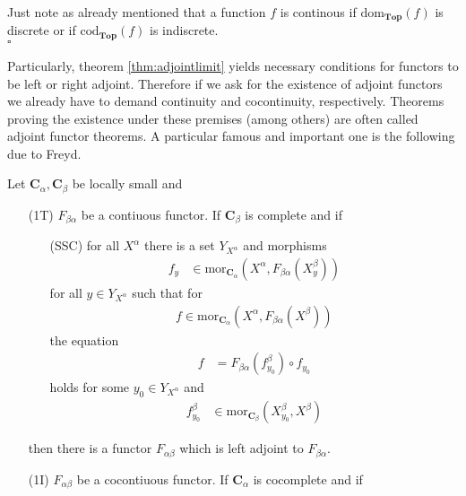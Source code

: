 \begin{prf}
Just note as already mentioned that a function $f$ is continous if $\mathrm{dom}_{\mathbf{Top}}(f)$ is discrete or if $\mathrm{cod}_{\mathbf{Top}}(f)$ is indiscrete.
\\
\phantom{proven}
\hfill
$\square$
\end{prf}
Particularly, theorem \ref{thm:adjointlimit} yields necessary conditions for functors to be left or right adjoint. Therefore if we ask for the existence of adjoint functors we already have to demand continuity and cocontinuity, respectively. Theorems proving the existence under these premises (among others) are often called adjoint functor theorems. A particular famous and important one is the following due to Freyd.
\\
\begin{thm}[Freyd]
\label{thm:aftfreyd}
Let $\mathbf{C}_{\alpha},\mathbf{C}_{\beta}$ be locally small and
\begin{enumerate}
\item[(1T)]
$F_{\beta\alpha}$ be a contiuous functor. If $\mathbf{C}_{\beta}$ is complete and if
\begin{enumerate}
\item[(SSC)]
for all $X^{\alpha}$ there is a set $Y_{X^{\alpha}}$ and morphisms
\begin{align*}
  f_{y}
  &\in
  \mathrm{mor}_{\mathbf{C}_{\alpha}}
  \left(
    X^{\alpha},
    F_{\beta\alpha}(X_{y}^{\beta})
  \right)
\end{align*}
for all $y \in Y_{X^{\alpha}}$ such that for
\begin{align*}
  f
  \in
  \mathrm{mor}_{\mathbf{C}_{\alpha}}
  \left(
    X^{\alpha},
    F_{\beta\alpha}(X^{\beta})
  \right)
\end{align*}
the equation
\begin{align*}
  f
  &=
  F_{\beta\alpha}(f_{y_{0}}^{\beta})
  \circ
  f_{y_{0}}
\end{align*}
holds for some $y_{0} \in Y_{X^{\alpha}}$ and
\begin{align*}
  f_{y_{0}}^{\beta}
  &\in
  \mathrm{mor}_{\mathbf{C}_{\beta}}
  \left(
    X_{y_{0}}^{\beta},
    X^{\beta}
  \right)
\end{align*}
\end{enumerate}
then there is a functor $F_{\alpha\beta}$ which is left adjoint to $F_{\beta\alpha}$.
\item[(1I)]
$F_{\alpha\beta}$ be a cocontiuous functor. If $\mathbf{C}_{\alpha}$ is cocomplete and if
\begin{enumerate}

\end{enumerate}
\end{enumerate}
\end{thm}
